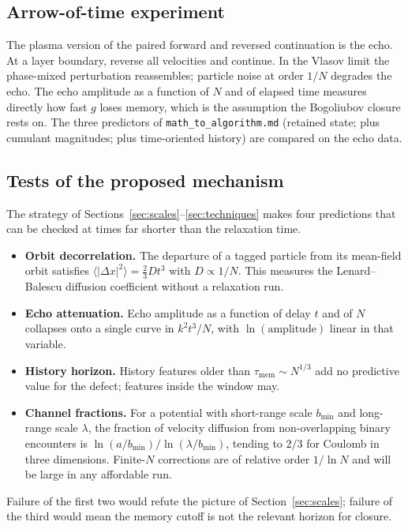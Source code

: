 \documentclass[11pt]{article}
\newcommand{\avg}[1]{\langle #1 \rangle}
\theoremstyle{definition}
\begin{document}
\subsection{Arrow-of-time experiment}

The plasma version of the paired forward and reversed continuation is the
echo. At a layer boundary, reverse all velocities and continue. In the
Vlasov limit the phase-mixed perturbation reassembles; particle noise at
order $1/N$ degrades the echo. The echo amplitude as a function of $N$ and of
elapsed time measures directly how fast $g$ loses memory, which is the
assumption the Bogoliubov closure rests on. The three predictors of
\texttt{math\_to\_algorithm.md} (retained state; plus cumulant magnitudes;
plus time-oriented history) are compared on the echo data.

\subsection{Tests of the proposed mechanism}
\label{sec:tests}

The strategy of Sections~\ref{sec:scales}--\ref{sec:techniques} makes four
predictions that can be checked at times far shorter than the relaxation
time.
\begin{itemize}
  \item \textbf{Orbit decorrelation.} The departure of a tagged particle
    from its mean-field orbit satisfies
    $\avg{|\Delta x|^2} = \tfrac{2}{3}Dt^3$ with $D\propto 1/N$. This
    measures the Lenard--Balescu diffusion coefficient without a relaxation
    run.
  \item \textbf{Echo attenuation.} Echo amplitude as a function of delay $t$
    and of $N$ collapses onto a single curve in $k^2t^3/N$, with
    $\ln(\text{amplitude})$ linear in that variable.
  \item \textbf{History horizon.} History features older than
    $\tau_{\mathrm{mem}}\sim N^{1/3}$ add no predictive value for the
    defect; features inside the window may.
  \item \textbf{Channel fractions.} For a potential with short-range scale
    $b_{\min}$ and long-range scale $\lambda$, the fraction of velocity
    diffusion from non-overlapping binary encounters is
    $\ln(a/b_{\min})/\ln(\lambda/b_{\min})$, tending to $2/3$ for Coulomb in
    three dimensions. Finite-$N$ corrections are of relative order
    $1/\ln N$ and will be large in any affordable run.
\end{itemize}
Failure of the first two would refute the picture of
Section~\ref{sec:scales}; failure of the third would mean the memory cutoff
is not the relevant horizon for closure.
\end{document}
